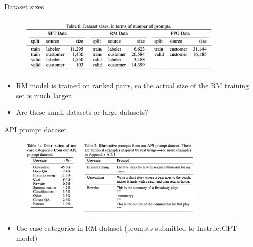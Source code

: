 \begin{vbframe}{Dataset sizes}

\vfill

\begin{figure}
\centering
\includegraphics[width = 10cm]{figure/datasetsize.png}
\end{figure}

\begin{itemize}
	\item RM model is trained on ranked pairs, so the
	actual size of the RM training set is much larger.
	\item \ques Are these small datasets or large datasets?
\end{itemize}

\vfill

\end{vbframe}

\begin{vbframe}{API prompt dataset}

\vfill

\begin{figure}
\centering
\includegraphics[width = 9cm]{figure/apipromptdataset.png}
\end{figure}

\begin{itemize}
	\item Use case categories in RM dataset
        (prompts  submitted to
        InstructGPT model)
\end{itemize}



\vfill

\end{vbframe}


